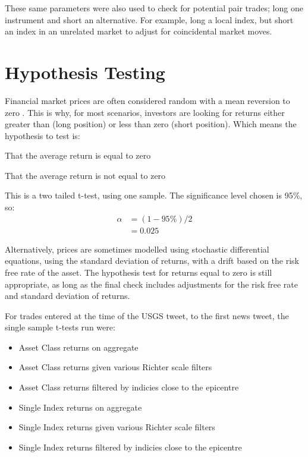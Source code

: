 These same parameters were also used to check for potential pair trades; long one instrument and short an alternative. For example, long a local index, but short an index in an unrelated market to adjust for coincidental market moves.

\pagebreak
\section{Hypothesis Testing}

Financial market prices are often considered random with a mean reversion to zero \cite{burton_random_walk}. This is why, for most scenarios, investors are looking for returns either greater than (long position) or less than zero (short position). Which means the hypothesis to test is:

\setcounter{hyp}{-1}
\begin{hyp} \label{hyp:null}That the average return is equal to zero \end{hyp}
\begin{hyp} \label{hyp:alt}That the average return is not equal to zero \end{hyp}

This is a two tailed t-test, using one sample. The significance level chosen is 95\%, so:
\begin{align*}
    \alpha&= (1 - 95\%)/2  \\
    &= 0.025
\end{align*}

Alternatively, prices are sometimes modelled using stochastic differential equations, using the standard deviation of returns, with a drift based on the risk free rate of the asset\cite{Hull_Options}. The hypothesis test for returns equal to zero is still appropriate, as long as the final check includes adjustments for the risk free rate and standard deviation of returns.

For trades entered at the time of the USGS tweet, to the first news tweet, the single sample t-tests run were:

\begin{itemize}
    \item Asset Class returns on aggregate
    \item Asset Class returns given various Richter scale filters
    \item Asset Class returns filtered by indicies close to the epicentre
    \item Single Index returns on aggregate
    \item Single Index returns given various Richter scale filters
    \item Single Index returns filtered by indicies close to the epicentre
\end{itemize}

